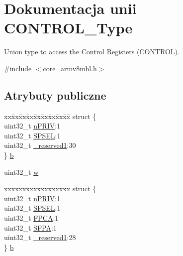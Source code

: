 \hypertarget{union_c_o_n_t_r_o_l___type}{}\section{Dokumentacja unii C\+O\+N\+T\+R\+O\+L\+\_\+\+Type}
\label{union_c_o_n_t_r_o_l___type}


Union type to access the Control Registers (C\+O\+N\+T\+R\+OL).  




{\ttfamily \#include $<$core\+\_\+armv8mbl.\+h$>$}

\subsection*{Atrybuty publiczne}
\begin{DoxyCompactItemize}
\item 
\begin{tabbing}
xx\=xx\=xx\=xx\=xx\=xx\=xx\=xx\=xx\=\kill
struct \{\\
\>uint32\_t \hyperlink{union_c_o_n_t_r_o_l___type_a35c1732cf153b7b5c4bd321cf1de9605}{nPRIV}:1\\
\>uint32\_t \hyperlink{union_c_o_n_t_r_o_l___type_a8cc085fea1c50a8bd9adea63931ee8e2}{SPSEL}:1\\
\>uint32\_t \hyperlink{union_c_o_n_t_r_o_l___type_aa7a5662079a447f801034d108f80ce49}{\_reserved1}:30\\
\} \hyperlink{union_c_o_n_t_r_o_l___type_adc6a38ab2980d0e9577b5a871da14eb9}{b}\\

\end{tabbing}\item 
uint32\+\_\+t \hyperlink{union_c_o_n_t_r_o_l___type_a6b642cca3d96da660b1198c133ca2a1f}{w}
\item 
\begin{tabbing}
xx\=xx\=xx\=xx\=xx\=xx\=xx\=xx\=xx\=\kill
struct \{\\
\>uint32\_t \hyperlink{union_c_o_n_t_r_o_l___type_a35c1732cf153b7b5c4bd321cf1de9605}{nPRIV}:1\\
\>uint32\_t \hyperlink{union_c_o_n_t_r_o_l___type_a8cc085fea1c50a8bd9adea63931ee8e2}{SPSEL}:1\\
\>uint32\_t \hyperlink{union_c_o_n_t_r_o_l___type_ac62cfff08e6f055e0101785bad7094cd}{FPCA}:1\\
\>uint32\_t \hyperlink{union_c_o_n_t_r_o_l___type_adab539fdfb991718401475bf6853669c}{SFPA}:1\\
\>uint32\_t \hyperlink{union_c_o_n_t_r_o_l___type_aa7a5662079a447f801034d108f80ce49}{\_reserved1}:28\\
\} \hyperlink{union_c_o_n_t_r_o_l___type_ae3b4861e899b1f68818b60033a3914d9}{b}\\


\end{tabbing}
\end{DoxyCompactItemize}

